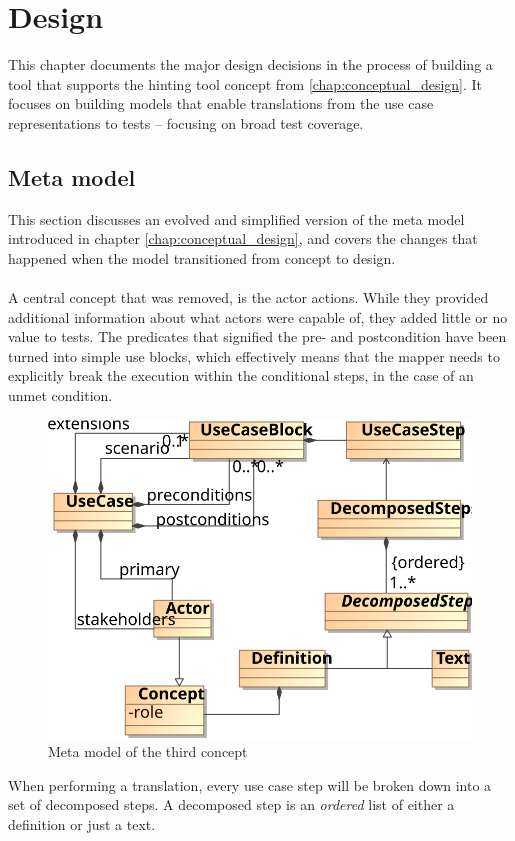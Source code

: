 \chapter{Design}
This chapter documents the major design decisions in the process of building a tool that supports the hinting tool concept from \ref{chap:conceptual_design}. It focuses on building models that enable translations from the use case representations to tests -- focusing on broad test coverage.

\section{Meta model}
This section discusses an evolved and simplified version of the meta model introduced in chapter \ref{chap:conceptual_design}, and covers the changes that happened when the model transitioned from concept to design.\\\\
A central concept that was removed, is the actor actions. While they provided additional information about what actors were capable of, they added little or no value to tests. The predicates that signified the pre- and postcondition have been turned into simple use blocks, which effectively means that the mapper needs to explicitly break the execution within the conditional steps, in the case of an unmet condition.
\begin{figure}[!htbp]
  \centering
  \includegraphics[scale=0.9]{img/3rd_iteration_meta_model}
  \caption{Meta model of the third concept}
  \label{fig:3rd_iteration_meta_model}
\end{figure}
When performing a translation, every use case step will be broken down into a set of decomposed steps. A decomposed step is an \emph{ordered} list of either a definition or just a text.

